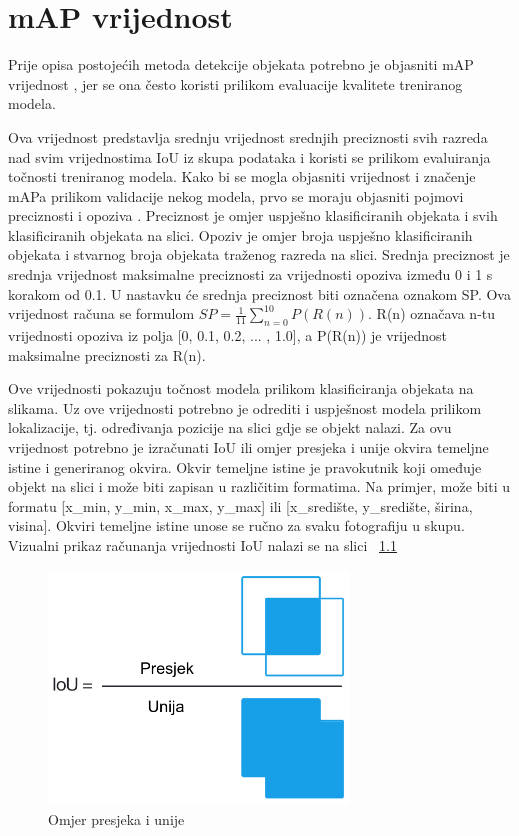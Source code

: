\chapter{mAP vrijednost}

Prije opisa postojećih metoda detekcije objekata potrebno je objasniti mAP vrijednost , jer se ona često koristi prilikom evaluacije
kvalitete treniranog modela.

Ova vrijednost predstavlja srednju vrijednost srednjih preciznosti svih razreda nad svim
vrijednostima IoU iz skupa podataka i koristi se prilikom evaluiranja točnosti treniranog modela. 
Kako bi se mogla objasniti vrijednost i značenje mAPa prilikom validacije nekog modela, prvo se moraju objasniti pojmovi
preciznosti  i opoziva . Preciznost je omjer uspješno klasificiranih objekata i svih klasificiranih objekata na slici. 
Opoziv je omjer broja uspješno klasificiranih objekata i stvarnog broja objekata traženog razreda na slici. 
Srednja preciznost  je srednja vrijednost maksimalne preciznosti za vrijednosti opoziva između 0 i 1 s korakom 
od 0.1. U nastavku će srednja preciznost biti označena oznakom SP. \newline 
Ova vrijednost računa se formulom  $SP=\frac{1}{11}\sum_{n=0}^{10} P(R(n))$. R(n) označava n-tu vrijednosti opoziva iz polja [0, 0.1, 0.2, ... , 1.0], a 
P(R(n)) je vrijednost maksimalne preciznosti za R(n). \citep{everingham2010pascal}

Ove vrijednosti pokazuju točnost modela prilikom klasificiranja objekata na slikama. Uz ove vrijednosti potrebno je odrediti i uspješnost modela prilikom lokalizacije, tj. 
određivanja pozicije na slici gdje se objekt nalazi. Za ovu vrijednost potrebno je izračunati IoU  ili omjer presjeka i unije okvira temeljne istine i 
generiranog okvira. Okvir temeljne istine je pravokutnik koji omeđuje objekt na slici i može biti zapisan u različitim formatima. Na primjer, može biti u formatu 
[x\_min, y\_min, x\_max, y\_max] ili [x\_središte, y\_središte, širina, visina]. Okviri temeljne istine unose se ručno za svaku fotografiju u skupu.
Vizualni prikaz računanja vrijednosti IoU nalazi se na slici ~\ref{IoU}

\begin{figure}[htb]
    \centering
    \includegraphics[width=8cm]{img/iou_equation.png}
    \caption{Omjer presjeka i unije}
    \label{IoU}
\end{figure}

